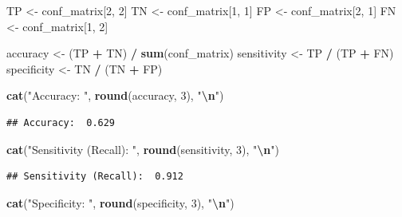 \documentclass[
]{article}
\newenvironment{Shaded}{\begin{snugshade}}{\end{snugshade}}
\newcommand{\DecValTok}[1]{\textcolor[rgb]{0.00,0.00,0.81}{#1}}
\newcommand{\FunctionTok}[1]{\textcolor[rgb]{0.13,0.29,0.53}{\textbf{#1}}}
\newcommand{\NormalTok}[1]{#1}
\newcommand{\OtherTok}[1]{\textcolor[rgb]{0.56,0.35,0.01}{#1}}
\newcommand{\SpecialCharTok}[1]{\textcolor[rgb]{0.81,0.36,0.00}{\textbf{#1}}}
\newcommand{\StringTok}[1]{\textcolor[rgb]{0.31,0.60,0.02}{#1}}
\begin{document}
\begin{Shaded}
\begin{Highlighting}[]
\NormalTok{TP }\OtherTok{\textless{}{-}}\NormalTok{ conf\_matrix[}\DecValTok{2}\NormalTok{, }\DecValTok{2}\NormalTok{]}
\NormalTok{TN }\OtherTok{\textless{}{-}}\NormalTok{ conf\_matrix[}\DecValTok{1}\NormalTok{, }\DecValTok{1}\NormalTok{]}
\NormalTok{FP }\OtherTok{\textless{}{-}}\NormalTok{ conf\_matrix[}\DecValTok{2}\NormalTok{, }\DecValTok{1}\NormalTok{]}
\NormalTok{FN }\OtherTok{\textless{}{-}}\NormalTok{ conf\_matrix[}\DecValTok{1}\NormalTok{, }\DecValTok{2}\NormalTok{]}

\NormalTok{accuracy }\OtherTok{\textless{}{-}}\NormalTok{ (TP }\SpecialCharTok{+}\NormalTok{ TN) }\SpecialCharTok{/} \FunctionTok{sum}\NormalTok{(conf\_matrix)}
\NormalTok{sensitivity }\OtherTok{\textless{}{-}}\NormalTok{ TP }\SpecialCharTok{/}\NormalTok{ (TP }\SpecialCharTok{+}\NormalTok{ FN) }
\NormalTok{specificity }\OtherTok{\textless{}{-}}\NormalTok{ TN }\SpecialCharTok{/}\NormalTok{ (TN }\SpecialCharTok{+}\NormalTok{ FP) }

\FunctionTok{cat}\NormalTok{(}\StringTok{"Accuracy: "}\NormalTok{, }\FunctionTok{round}\NormalTok{(accuracy, }\DecValTok{3}\NormalTok{), }\StringTok{"}\SpecialCharTok{\textbackslash{}n}\StringTok{"}\NormalTok{)}
\end{Highlighting}
\end{Shaded}

\begin{verbatim}
## Accuracy:  0.629
\end{verbatim}

\begin{Shaded}
\begin{Highlighting}[]
\FunctionTok{cat}\NormalTok{(}\StringTok{"Sensitivity (Recall): "}\NormalTok{, }\FunctionTok{round}\NormalTok{(sensitivity, }\DecValTok{3}\NormalTok{), }\StringTok{"}\SpecialCharTok{\textbackslash{}n}\StringTok{"}\NormalTok{)}
\end{Highlighting}
\end{Shaded}

\begin{verbatim}
## Sensitivity (Recall):  0.912
\end{verbatim}

\begin{Shaded}
\begin{Highlighting}[]
\FunctionTok{cat}\NormalTok{(}\StringTok{"Specificity: "}\NormalTok{, }\FunctionTok{round}\NormalTok{(specificity, }\DecValTok{3}\NormalTok{), }\StringTok{"}\SpecialCharTok{\textbackslash{}n}\StringTok{"}\NormalTok{)}
\end{Highlighting}
\end{Shaded}
\end{document}
